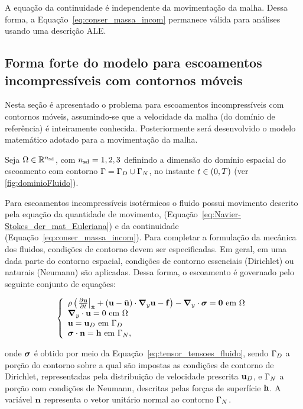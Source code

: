 A equação da continuidade é independente da movimentação da malha. Dessa forma, a Equação~\eqref{eq:conser_massa_incom} permanece válida para análises usando uma descrição ALE.

\subsection{Forma forte do modelo para escoamentos incompressíveis com contornos móveis}

Nesta seção é apresentado o problema para escoamentos incompressíveis com contornos móveis, assumindo-se que a velocidade da malha (do domínio de referência) é inteiramente conhecida. Posteriormente será desenvolvido o modelo matemático adotado para a movimentação da malha.

Seja $\Omega \in \mathbb{R}^{{n_{\mathrm{sd}}}}$, com ${n_{\mathrm{sd}}} = 1,2,3$ definindo a dimensão do domínio espacial do escoamento com contorno $\Gamma = \Gamma_{D} \cup \Gamma_{N}$, no instante $t \in (0,T)$ (ver \autoref{fig:dominioFluido}).

Para escoamentos incompressíveis isotérmicos o fluido possui movimento descrito pela equação da quantidade de movimento, (Equação~\eqref{eq:Navier-Stokes_der_mat_Euleriana}) e da continuidade (Equação~\eqref{eq:conser_massa_incom}). Para completar a formulação da mecânica dos fluidos, condições de contorno devem ser especificadas. Em geral, em uma dada parte do contorno espacial, condições de contorno essenciais (Dirichlet) ou naturais (Neumann) são aplicadas. Dessa forma, o escoamento é governado pelo seguinte conjunto de equações:

\begin{equation}
	\left\{
	\begin{array}{l}
		\density\left( \left. \frac{\partial\velocity}{\partial t} \right|_{\posALE}  + \left(\velocity - \velocityALE \right)\cdot\gradient\velocity - \sbodyforce \right) - \divergence \cdot \stressTensor = \vzero  \ \textrm{em} \ \domain\\
		\divergence \cdot \velocity = 0  \ \textrm{em} \ \domain\\
		\velocity = \velocityD \ \textrm{em} \ \boundaryD \\
		\stressTensor \cdot \snormal = \surfaceLoad \ \textrm{em} \ \boundaryN,
	\end{array} \label{eq:conj_eq_DFC_ALE}
	\right.
\end{equation}

\noindent onde $\boldsymbol{\sigma}$ é obtido por meio da Equação~\eqref{eq:tensor_tensoes_fluido}, sendo $\Gamma_{D}$ a porção do contorno sobre a qual são impostas as condições de contorno de Dirichlet, representadas pela distribuição de velocidade prescrita $\mathbf{u}_D$, e $\Gamma_{N}$ a porção com condições de Neumann, descritas pelas forças de superfície $\mathbf{h}$. A variável $\mathbf{n}$ representa o vetor unitário normal ao contorno $\Gamma_{N}$.

